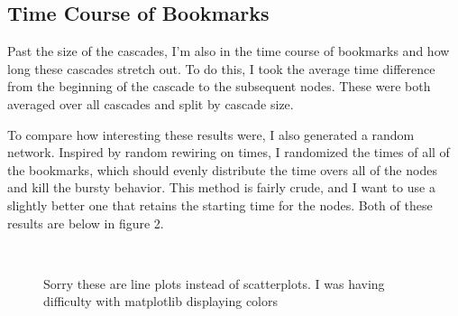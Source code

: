 \documentclass[11pt]{amsart}
\begin{document}
\subsection{Time Course of Bookmarks}

Past the size of the cascades, I'm also in the time course of bookmarks and how long these cascades stretch out. To do this, I took the average time difference from the beginning of the cascade to the subsequent nodes. These were both averaged over all cascades and split by cascade size.

To compare how interesting these results were, I also generated a random network. Inspired by random rewiring on times\cite{bursty}, I randomized the times of all of the bookmarks, which should evenly distribute the time overs all of the nodes and kill the bursty behavior. This method is fairly crude, and I want to use a slightly better one that retains the starting time for the nodes. Both of these results are below in figure 2.

\begin{figure}
	\centering
	 \\
\caption{Sorry these are line plots instead of scatterplots. I was having difficulty with matplotlib displaying colors}
\end{figure}
\end{document}
